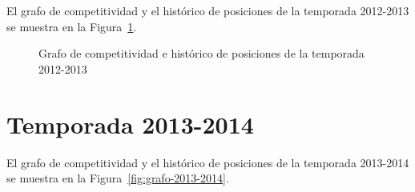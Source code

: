 El grafo de competitividad y el histórico de posiciones de la temporada 2012-2013 se muestra en la Figura~\ref{fig:grafo-2012-2013}.

\begin{figure}[htbp]
\centering
{}
\caption[Competitividad de la temporada 2012-2013]{Grafo de competitividad e histórico de posiciones de la temporada 2012-2013} \label{fig:grafo-2012-2013}
\end{figure}

\clearpage

\section{Temporada 2013-2014}

El grafo de competitividad y el histórico de posiciones de la temporada 2013-2014 se muestra en la Figura~\ref{fig:grafo-2013-2014}.

